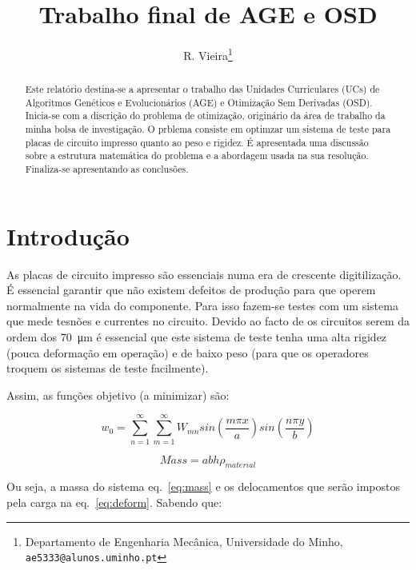 \documentclass[a4paper,12pt]{article}
\begin{document}
%
\title{Trabalho final de AGE e OSD}


\author{R. Vieira\thanks{Departamento de Engenharia Mecânica, Universidade do Minho, {\tt ae5333@alunos.uminho.pt}}}

\maketitle              %

\begin{abstract}
Este relatório destina-se a apresentar o trabalho das Unidades Curriculares (UCs) de Algoritmos Genéticos e Evolucionários (AGE) e Otimização Sem Derivadas (OSD). Inicia-se com a discrição do problema de otimização, originário da área de trabalho da minha bolsa de investigação. O prblema consiste em optimzar um sistema de teste para placas de circuito impresso quanto ao peso e rigidez. É apresentada uma discussão sobre a estrutura matemática do problema e a abordagem usada na sua resolução. Finaliza-se apresentando as conclusões.
\end{abstract}

\section{Introdução}

As placas de circuito impresso são essenciais numa era de crescente digitilização. É essencial garantir que não existem defeitos de produção para que operem normalmente na vida do componente. Para isso fazem-se testes com um sistema que mede tesnões e currentes no circuito. Devido ao facto de os circuitos serem da ordem dos \SI{70}{\micro\metre} é essencial que este sistema de teste tenha uma alta rigidez (pouca deformação em operação) e de baixo peso (para que os operadores troquem os sistemas de teste facilmente). 

Assim, as funções objetivo (a minimizar) são:


\begin{equation}\label{eq:deform}
w_0= \sum_{n=1}^{\infty} \sum_{m=1}^{\infty} W_{mn} sin\left(\frac{m \pi x}{a}\right) sin\left(\frac{n \pi y}{b}\right)
\end{equation}

\begin{equation}\label{eq:mass}
Mass = a b h \rho_{material}
\end{equation}

Ou seja, a massa do sistema eq.~\ref{eq:mass} e os delocamentos que serão impostos pela carga na eq.~\ref{eq:deform}. Sabendo que:
\end{document}
